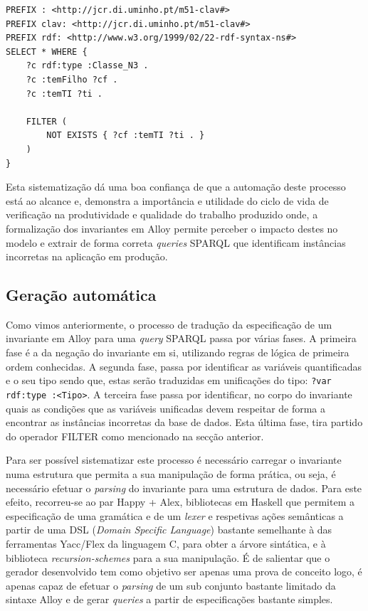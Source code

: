 \documentclass[tikz,runningheads,a4paper]{llncs}
\begin{document}
\begin{lstlisting}[language=sparql, frame=single, basicstyle=\scriptsize]
PREFIX : <http://jcr.di.uminho.pt/m51-clav#>
PREFIX clav: <http://jcr.di.uminho.pt/m51-clav#>
PREFIX rdf: <http://www.w3.org/1999/02/22-rdf-syntax-ns#>
SELECT * WHERE { 
    ?c rdf:type :Classe_N3 .
    ?c :temFilho ?cf .
    ?c :temTI ?ti .
   	
    FILTER (
        NOT EXISTS { ?cf :temTI ?ti . }
	)
}
\end{lstlisting} 

Esta sistematização dá uma boa confiança de que a automação deste processo está
ao alcance e, demonstra a importância e utilidade do ciclo de vida de verificação na produtividade e qualidade do trabalho produzido onde,
a formalização dos invariantes em Alloy permite perceber o impacto destes no modelo e extrair de forma correta \textit{queries} SPARQL que 
identificam instâncias incorretas na aplicação em produção.

\subsection{Geração automática}

Como vimos anteriormente, o processo de tradução da especificação de um
invariante em Alloy para uma \textit{query} SPARQL passa por várias fases. A
primeira fase é a da negação do invariante em si, utilizando regras de lógica de
primeira ordem conhecidas. A segunda fase, passa por identificar as variáveis
quantificadas e o seu tipo sendo que, estas serão traduzidas em unificações do
tipo: \texttt{?var rdf:type :<Tipo>}. A terceira fase passa por identificar, no
corpo do invariante quais as condições que as variáveis unificadas devem
respeitar de forma a encontrar as instâncias incorretas da base de dados. Esta
última fase, tira partido do operador FILTER como mencionado na secção anterior.

Para ser possível sistematizar este processo é necessário carregar o invariante
numa estrutura que permita a sua manipulação de forma prática, ou seja, é
necessário efetuar o \textit{parsing} do invariante para uma estrutura de dados.
Para este efeito, recorreu-se ao par Happy + Alex, bibliotecas em Haskell que
permitem a especificação de uma gramática e de um \textit{lexer} e respetivas
ações semânticas a partir de uma DSL (\textit{Domain Specific Language}) bastante
semelhante à das ferramentas Yacc/Flex da linguagem C, para obter a árvore sintática,
e à biblioteca \textit{recursion-schemes} para a sua manipulação. É de
salientar que o gerador desenvolvido tem como objetivo ser apenas uma prova de
conceito logo, é apenas capaz de efetuar o \textit{parsing} de um sub conjunto
bastante limitado da sintaxe Alloy e de gerar \textit{queries} a partir de
especificações bastante simples.
\end{document}
